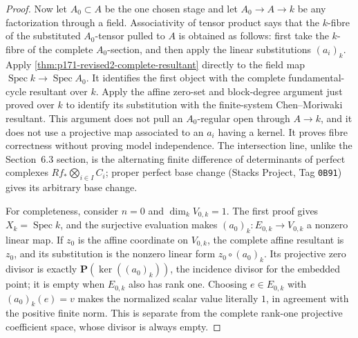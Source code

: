 \begin{proof}
Now let \(A_0\subset A\) be the one chosen stage and let
\(A_0\to A\to k\) be any factorization through a field.  Associativity of
tensor product says that the \(k\)-fibre of the substituted \(A_0\)-tensor
pulled to \(A\) is obtained as follows: first take the \(k\)-fibre of the
complete \(A_0\)-section, and then apply the linear substitutions
\((a_i)_k\).  Apply
\cref{thm:p171-revised2-complete-resultant} directly to the field
map \(\operatorname{Spec}k\to\operatorname{Spec}A_0\).  It identifies the
first object with the complete fundamental-cycle resultant over \(k\).
Apply the affine zero-set and block-degree argument just proved over \(k\)
to identify its substitution with the finite-system Chen--Moriwaki
resultant.  This argument does not pull an \(A_0\)-regular open through
\(A\to k\), and it does not use a projective map associated to an
\(a_i\) having a kernel.  It proves fibre correctness without proving model
independence.  The intersection line, unlike the Section~6.3 section, is
the alternating finite difference of determinants of perfect complexes
\(Rf_*\bigotimes_{i\in I}C_i\); proper perfect base change (Stacks Project,
Tag \texttt{0B91}) gives its arbitrary base change.

For completeness, consider \(n=0\) and \(\dim_kV_{0,k}=1\).  The first
proof gives \(X_k=\operatorname{Spec}k\), and the surjective evaluation
makes \((a_0)_k:E_{0,k}\to V_{0,k}\) a nonzero linear map.  If \(z_0\)
is the affine coordinate on \(V_{0,k}\), the complete affine resultant is
\(z_0\), and its substitution is the nonzero linear form
\(z_0\circ(a_0)_k\).  Its projective zero divisor is exactly
\(\mathbf P(\ker((a_0)_k))\), the incidence divisor for the embedded point;
it is empty when \(E_{0,k}\) also has rank one.  Choosing
\(e\in E_{0,k}\) with \((a_0)_k(e)=v\) makes the normalized scalar value
literally \(1\), in agreement with the positive finite norm.  This is
separate from the complete rank-one projective coefficient space, whose
divisor is always empty.
\end{proof}


